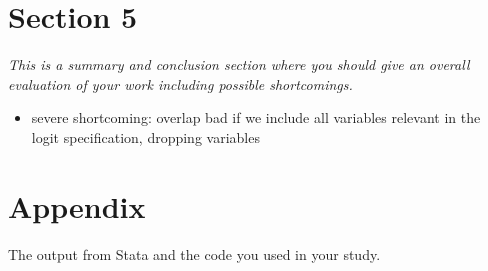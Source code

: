 \documentclass[11pt,a4paper,leqno]{article}
\begin{document}
\section*{Section 5} 
\textit{This is a summary and conclusion section where you should give an overall evaluation of your work including possible shortcomings.}
\begin{itemize}
	\item severe shortcoming: overlap bad if we include all variables relevant in the logit specification, dropping variables  
\end{itemize}




\nocite{chen2011}
\clearpage



\appendix
\section*{Appendix}
The output from Stata and the code you used in your study.
\end{document}
